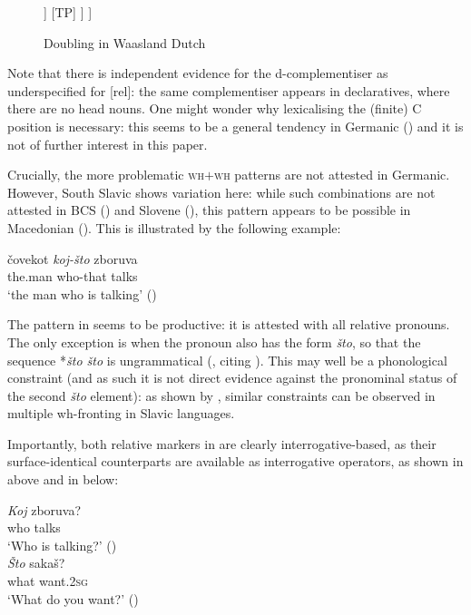 \documentclass[output=paper]{langscibook}
\begin{document}
\begin{figure} 
\caption{Doubling in Waasland Dutch} 
\label{bacsk:fig:treedutch}
\begin{forest}
[CP
	[die\textsubscript{{[}i-rel{]}}]
	[C$'$
		[C\textsubscript{{[}u-rel{]},{[}fin{]}} [dat\textsubscript{{[}fin{]}}]]
		[TP]
	]
]
\end{forest}
\end{figure}

Note that there is independent evidence for the d-complementiser as underspecified for [rel]: the same complementiser appears in declaratives, where there are no head nouns. One might wonder why lexicalising the (finite) C position is necessary: this seems to be a general tendency in Germanic (\citealt{bacskaiatkari2018slavic, bacskaiatkari2020jcgl}) and it is not of further interest in this paper.

Crucially, the more problematic \textsc{wh}$+$\textsc{wh} patterns are not attested in Germanic. However, South Slavic shows variation here: while such combinations are not attested in BCS (\citealt[292]{goodluckstojanovic1996}) and Slovene (\citealt[12--13]{hladnik2010}), this pattern appears to be possible in Macedonian (\citealt[320]{rudin2014}). This is illustrated by the following example:

\ea \gll čovekot \textit{koj-što} zboruva \label{bacsk:ex:macedonian}\\
the.man who-that talks\\
\glt `the man who is talking' \hfill (\citealt[316]{rudin2014})
\z

\noindent The pattern in  seems to be productive: it is attested with all relative pronouns. The only exception is when the pronoun also has the form \textit{što}, so that the sequence *\textit{što što} is ungrammatical (\citealt[320]{rudin2014}, citing \citealt{kramer1999}). This may well be a phonological constraint (and as such it is not direct evidence against the pronominal status of the second \textit{što} element): as shown by \citet{boskovic2002}, similar constraints can be observed in multiple wh-fronting in Slavic languages.

Importantly, both relative markers in  are clearly interrogative-based, as their surface-identical counterparts are available as interrogative operators, as shown in  above and in  below:

\ea\label{bacsk:ex:macrudin}
\ea \gll \textit{Koj} zboruva?\\
who talks\\
\glt `Who is talking?' \hfill (\citealt[315]{rudin2014})\\
\ex \gll \textit{Što} sakaš?\\
what want.\textsc{2sg}\\
\glt `What do you want?' \hfill (\citealt[320]{rudin2014})
\z
\z
\end{document}
